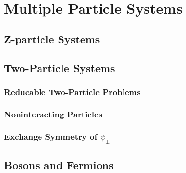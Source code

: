 \section{Multiple Particle Systems}
\subsection{Z-particle Systems}
\subsection{Two-Particle Systems}
\subsubsection{Reducable Two-Particle Problems}
\subsubsection{Noninteracting Particles}
\subsubsection[Exchange Symmetry]{Exchange Symmetry of $\psi_\pm$}
\subsection{Bosons and Fermions}